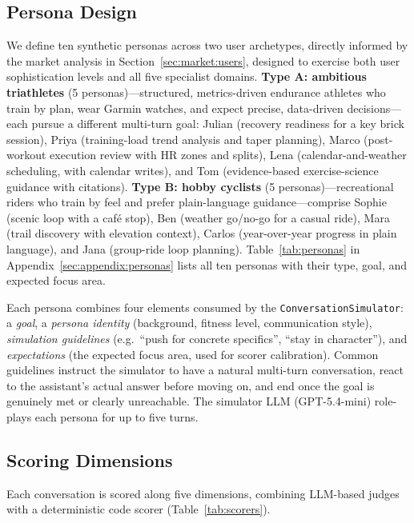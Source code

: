 \subsection{Persona Design}\label{sec:evaluation:personas}

We define ten synthetic personas across two user archetypes, directly informed by the market analysis in Section~\ref{sec:market:users}, designed to exercise both user sophistication levels and all five specialist domains. \textbf{Type A: ambitious triathletes} (5 personas)---structured, metrics-driven endurance athletes who train by plan, wear Garmin watches, and expect precise, data-driven decisions---each pursue a different multi-turn goal: Julian (recovery readiness for a key brick session), Priya (training-load trend analysis and taper planning), Marco (post-workout execution review with HR zones and splits), Lena (calendar-and-weather scheduling, with calendar writes), and Tom (evidence-based exercise-science guidance with citations). \textbf{Type B: hobby cyclists} (5 personas)---recreational riders who train by feel and prefer plain-language guidance---comprise Sophie (scenic loop with a caf\'e stop), Ben (weather go/no-go for a casual ride), Mara (trail discovery with elevation context), Carlos (year-over-year progress in plain language), and Jana (group-ride loop planning). Table~\ref{tab:personas} in Appendix~\ref{sec:appendix:personas} lists all ten personas with their type, goal, and expected focus area.

Each persona combines four elements consumed by the \texttt{ConversationSimulator}: a \textit{goal}, a \textit{persona identity} (background, fitness level, communication style), \textit{simulation guidelines} (e.g.\ ``push for concrete specifics'', ``stay in character''), and \textit{expectations} (the expected focus area, used for scorer calibration). Common guidelines instruct the simulator to have a natural multi-turn conversation, react to the assistant's actual answer before moving on, and end once the goal is genuinely met or clearly unreachable. The simulator LLM (GPT-5.4-mini) role-plays each persona for up to five turns.

\subsection{Scoring Dimensions}\label{sec:evaluation:scorers}

Each conversation is scored along five dimensions, combining LLM-based judges with a deterministic code scorer (Table~\ref{tab:scorers}).

